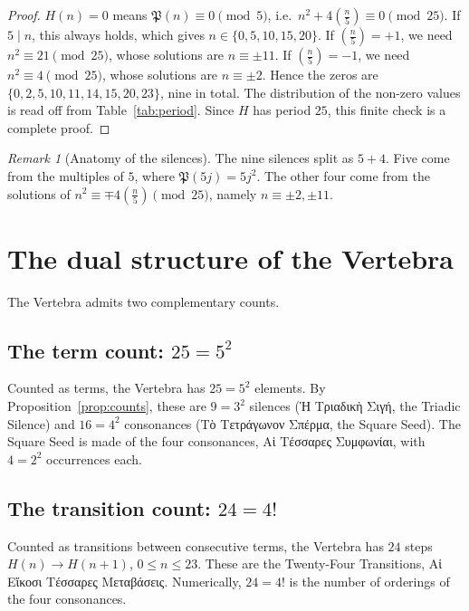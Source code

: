 \documentclass[11pt,a4paper]{article}
\newcommand{\gr}[1]{{\greekfont #1}}                 %
\newcommand{\Pent}{\mathfrak{P}}                      %
\newcommand{\leg}[1]{\left(\tfrac{#1}{5}\right)}      %
\theoremstyle{plain}
\theoremstyle{definition}
\theoremstyle{remark}
\newtheorem{remark}[theorem]{Remark}
\begin{document}
\begin{proof}
$H(n)=0$ means $\Pent(n)\equiv0\pmod5$, i.e.\ $n^{2}+4\leg{n}\equiv0\pmod{25}$. If $5\mid n$, this always holds, which gives $n\in\{0,5,10,15,20\}$. If $\leg{n}=+1$, we need $n^{2}\equiv21\pmod{25}$, whose solutions are $n\equiv\pm11$. If $\leg{n}=-1$, we need $n^{2}\equiv4\pmod{25}$, whose solutions are $n\equiv\pm2$. Hence the zeros are $\{0,2,5,10,11,14,15,20,23\}$, nine in total. The distribution of the non-zero values is read off from Table~\ref{tab:period}. Since $H$ has period $25$, this finite check is a complete proof.
\end{proof}

\begin{remark}[Anatomy of the silences]
The nine silences split as $5+4$. Five come from the multiples of $5$, where $\Pent(5j)=5j^{2}$. The other four come from the solutions of $n^{2}\equiv\mp4\leg{n}\pmod{25}$, namely $n\equiv\pm2,\pm11$.
\end{remark}

\section{The dual structure of the Vertebra}\label{sec:dual}

The Vertebra admits two complementary counts.

\subsection{The term count: \texorpdfstring{$25=5^{2}$}{25 = 5\textasciicircum 2}}

Counted as terms, the Vertebra has $25=5^{2}$ elements. By Proposition~\ref{prop:counts}, these are $9=3^{2}$ silences (\gr{Ἡ Τριαδικὴ Σιγή}, the Triadic Silence) and $16=4^{2}$ consonances (\gr{Τὸ Τετράγωνον Σπέρμα}, the Square Seed). The Square Seed is made of the four consonances, \gr{Αἱ Τέσσαρες Συμφωνίαι}, with $4=2^{2}$ occurrences each.

\subsection{The transition count: \texorpdfstring{$24=4!$}{24 = 4!}}

Counted as transitions between consecutive terms, the Vertebra has $24$ steps $H(n)\to H(n+1)$, $0\le n\le 23$. These are the Twenty-Four Transitions, \gr{Αἱ Εἴκοσι Τέσσαρες Μεταβάσεις}. Numerically, $24=4!$ is the number of orderings of the four consonances.
\end{document}
